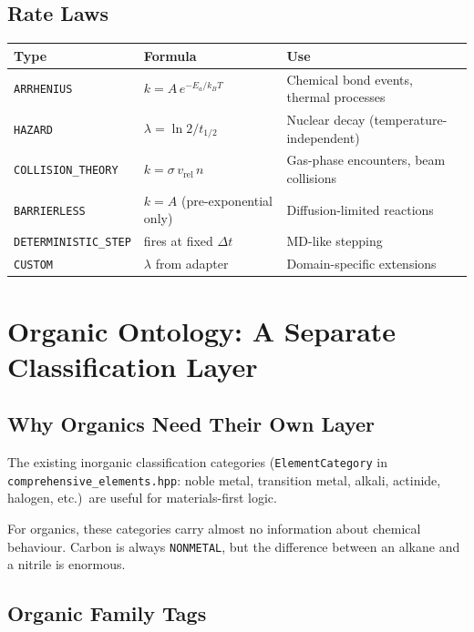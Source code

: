 \documentclass[11pt]{article}
\begin{document}
\subsection{Rate Laws}

\begin{center}
\begin{tabular}{llp{6.5cm}}
\toprule
Type & Formula & Use \\
\midrule
\texttt{ARRHENIUS}         & $k = A\,e^{-E_a/k_BT}$
  & Chemical bond events, thermal processes \\
\texttt{HAZARD}            & $\lambda = \ln 2 / t_{1/2}$
  & Nuclear decay (temperature-independent) \\
\texttt{COLLISION\_THEORY} & $k = \sigma\, v_\text{rel}\, n$
  & Gas-phase encounters, beam collisions \\
\texttt{BARRIERLESS}       & $k = A$ (pre-exponential only)
  & Diffusion-limited reactions \\
\texttt{DETERMINISTIC\_STEP} & fires at fixed $\Delta t$
  & MD-like stepping \\
\texttt{CUSTOM}            & $\lambda$ from adapter
  & Domain-specific extensions \\
\bottomrule
\end{tabular}
\end{center}

\section{Organic Ontology: A Separate Classification Layer}
\label{sec:organic}

\subsection{Why Organics Need Their Own Layer}

The existing inorganic classification categories (\texttt{ElementCategory}
in \texttt{comprehensive\_elements.hpp}: noble metal, transition metal,
alkali, actinide, halogen, etc.)\ are useful for materials-first logic.

For organics, these categories carry almost no information about chemical
behaviour.  Carbon is always \texttt{NONMETAL}, but the difference between
an alkane and a nitrile is enormous.

\subsection{Organic Family Tags}
\end{document}
